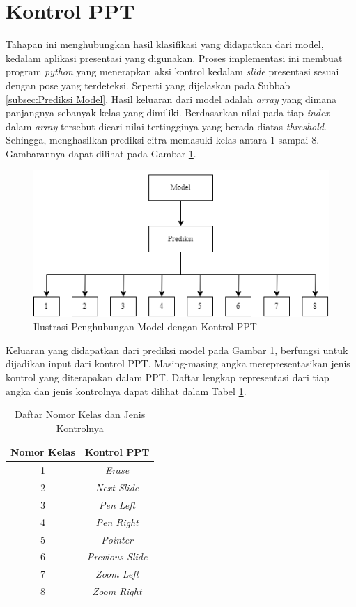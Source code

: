 \section{Kontrol PPT}
\label{kontrolppt}

Tahapan ini menghubungkan hasil klasifikasi yang didapatkan dari model, kedalam aplikasi presentasi yang digunakan. Proses implementasi ini membuat program \emph{python} yang menerapkan aksi kontrol kedalam \emph{slide} presentasi sesuai dengan pose yang terdeteksi. Seperti yang dijelaskan pada Subbab \ref{subsec:Prediksi Model}, Hasil keluaran dari model adalah \emph{array} yang dimana panjangnya sebanyak kelas yang dimiliki. Berdasarkan nilai pada tiap \emph{index} dalam \emph{array} tersebut dicari nilai tertingginya yang berada diatas \emph{threshold}. Sehingga, menghasilkan prediksi citra memasuki kelas antara 1 sampai 8. Gambarannya dapat dilihat pada Gambar \ref{fig:Ilustrasi Penghubungan Model dengan Kontrol PPT}.

\newpage

\begin{figure}[ht]
  \centering
  \includegraphics[scale=0.9]{gambar/output-model.png}
  \caption{Ilustrasi Penghubungan Model dengan Kontrol PPT}
  \label{fig:Ilustrasi Penghubungan Model dengan Kontrol PPT}
\end{figure}

Keluaran yang didapatkan dari prediksi model pada Gambar \ref{fig:Ilustrasi Penghubungan Model dengan Kontrol PPT}, berfungsi untuk dijadikan input dari kontrol PPT. Masing-masing angka merepresentasikan jenis kontrol yang diterapakan dalam PPT. Daftar lengkap representasi dari tiap angka dan jenis kontrolnya dapat dilihat dalam Tabel \ref{tb:Daftar Nomor Kelas dan Jenis Kontrolnya}.

\begin{longtable}{|c|c|}
  \caption{Daftar Nomor Kelas dan Jenis Kontrolnya}
  \label{tb:Daftar Nomor Kelas dan Jenis Kontrolnya}\\
  \hline
  \textbf{Nomor Kelas} & \textbf{Kontrol PPT} \\
  \hline
  1 & \emph{Erase}  \\
  2 & \emph{Next Slide}  \\
  3 & \emph{Pen Left}  \\
  4 & \emph{Pen Right}  \\
  5 & \emph{Pointer}  \\
  6 & \emph{Previous Slide}  \\
  7 & \emph{Zoom Left}  \\
  8 & \emph{Zoom Right}  \\
  \hline
\end{longtable}

